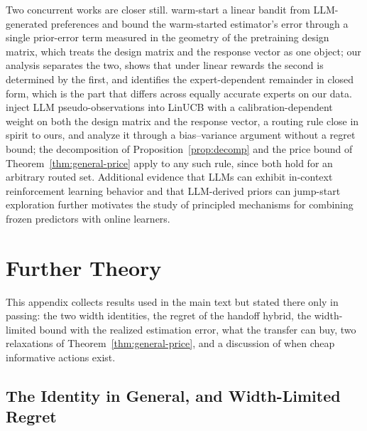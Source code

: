 \documentclass[anon]{alt2027} %
\begin{document}
Two concurrent works are closer still. \citet{jumpstart2026} warm-start a linear
bandit from LLM-generated preferences and bound the warm-started estimator's
error through a single prior-error term measured in the geometry of the
pretraining design matrix, which treats the design matrix and the response
vector as one object; our analysis separates the two, shows that under linear
rewards the second is determined by the first, and identifies the
expert-dependent remainder in closed form, which is the part that differs
across equally accurate experts on our data. \citet{calibgated2026} inject LLM
pseudo-observations into LinUCB with a calibration-dependent weight on both the
design matrix and the response vector, a routing rule close in spirit to ours,
and analyze it through a bias--variance argument without a regret bound; the
decomposition of Proposition~\ref{prop:decomp} and the price bound of
Theorem~\ref{thm:general-price} apply to any such rule, since both hold for an
arbitrary routed set. Additional evidence that LLMs can
exhibit in-context reinforcement learning behavior
\citep{monea2024llms,krishnamurthy2024can} and that LLM-derived priors can
jump-start exploration \citep{alamdari2024jumpstarting,abbasiyadkori2024believe}
further motivates the study of principled mechanisms for combining frozen
predictors with online learners.


\section{Further Theory}
\label{app:extra-theory}

This appendix collects results used in the main text but stated there only in
passing: the two width identities, the regret of the handoff hybrid, the
width-limited bound with the realized estimation error, what the transfer can
buy, two relaxations of Theorem~\ref{thm:general-price}, and a discussion of
when cheap informative actions exist.

\subsection{The Identity in General, and Width-Limited Regret}
\label{app:width-limited}
\label{sec:width}
\end{document}
